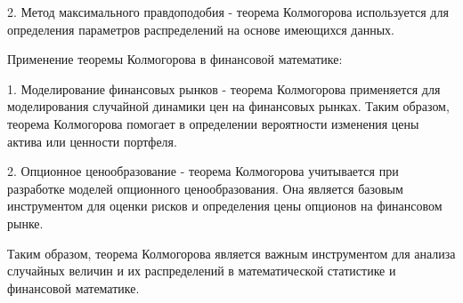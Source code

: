 2. Метод максимального правдоподобия - теорема Колмогорова используется для определения параметров распределений на основе имеющихся данных.

Применение теоремы Колмогорова в финансовой математике:

1. Моделирование финансовых рынков - теорема Колмогорова применяется для моделирования случайной динамики цен на финансовых рынках. Таким образом, теорема Колмогорова помогает в определении вероятности изменения цены актива или ценности портфеля.

2. Опционное ценообразование - теорема Колмогорова учитывается при разработке моделей опционного ценообразования. Она является базовым инструментом для оценки рисков и определения цены опционов на финансовом рынке. 

Таким образом, теорема Колмогорова является важным инструментом для анализа случайных величин и их распределений в математической статистике и финансовой математике.
